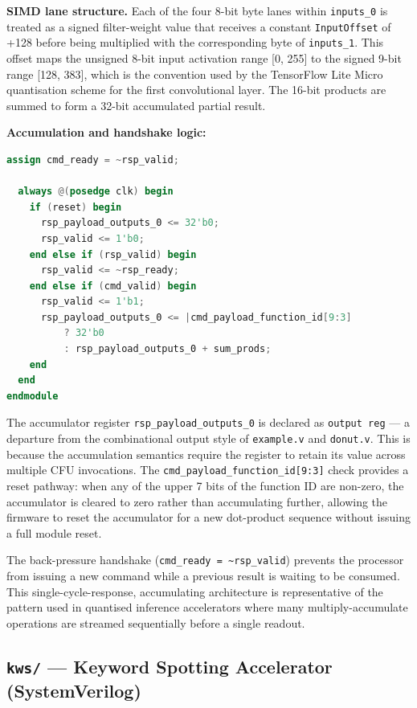 \textbf{SIMD lane structure.} Each of the four 8-bit byte lanes within \texttt{inputs\_0} is treated as a signed filter-weight value that receives a constant \texttt{InputOffset} of +128 before being multiplied with the corresponding byte of \texttt{inputs\_1}. This offset maps the unsigned 8-bit input activation range [0, 255] to the signed 9-bit range [128, 383], which is the convention used by the TensorFlow Lite Micro quantisation scheme for the first convolutional layer. The 16-bit products are summed to form a 32-bit accumulated partial result.

\textbf{Accumulation and handshake logic:}

\begin{lstlisting}[style=mystyle, language=Verilog]
  assign cmd_ready = ~rsp_valid;

  always @(posedge clk) begin
    if (reset) begin
      rsp_payload_outputs_0 <= 32'b0;
      rsp_valid <= 1'b0;
    end else if (rsp_valid) begin
      rsp_valid <= ~rsp_ready;
    end else if (cmd_valid) begin
      rsp_valid <= 1'b1;
      rsp_payload_outputs_0 <= |cmd_payload_function_id[9:3]
          ? 32'b0
          : rsp_payload_outputs_0 + sum_prods;
    end
  end
endmodule
\end{lstlisting}

The accumulator register \texttt{rsp\_payload\_outputs\_0} is declared as \texttt{output reg} — a departure from the combinational output style of \texttt{example.v} and \texttt{donut.v}. This is because the accumulation semantics require the register to retain its value across multiple CFU invocations. The \texttt{cmd\_payload\_function\_id[9:3]} check provides a reset pathway: when any of the upper 7 bits of the function ID are non-zero, the accumulator is cleared to zero rather than accumulating further, allowing the firmware to reset the accumulator for a new dot-product sequence without issuing a full module reset.

The back-pressure handshake (\texttt{cmd\_ready = \textasciitilde{}rsp\_valid}) prevents the processor from issuing a new command while a previous result is waiting to be consumed. This single-cycle-response, accumulating architecture is representative of the pattern used in quantised inference accelerators where many multiply-accumulate operations are streamed sequentially before a single readout.

\subsection{\texttt{kws/} — Keyword Spotting Accelerator (SystemVerilog)}

